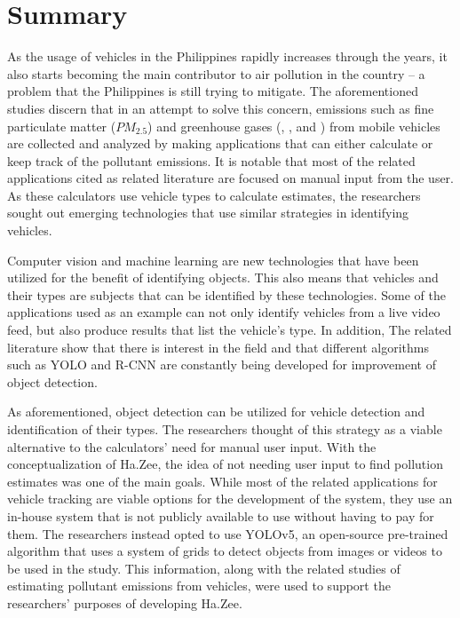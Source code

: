 \section{Summary}
 As the usage of vehicles in the Philippines rapidly increases through the years, it also starts becoming the main contributor to air pollution in the country – a problem that the Philippines is still trying to mitigate. The aforementioned studies discern that in an attempt to solve this concern, emissions such as fine particulate matter ($PM_{2.5}$) and greenhouse gases (, , and ) from mobile vehicles are collected and analyzed by making applications that can either calculate or keep track of the pollutant emissions. It is notable that most of the related applications cited as related literature are focused on manual input from the user. As these calculators use vehicle types to calculate estimates, the researchers sought out emerging technologies that use similar strategies in identifying vehicles.
 
	Computer vision and machine learning are new technologies that have been utilized for the benefit of identifying objects. This also means that vehicles and their types are subjects that can be identified by these technologies. Some of the applications used as an example can not only identify vehicles from a live video feed, but also produce results that list the vehicle's type. In addition, The related literature show that there is interest in the field and that different algorithms such as YOLO and R-CNN are constantly being developed for improvement of object detection.
	
	As aforementioned, object detection can be utilized for vehicle detection and identification of their types. The researchers thought of this strategy as a viable alternative to the calculators' need for manual user input. With the conceptualization of Ha.Zee, the idea of not needing user input to find pollution estimates was one of the main goals. While most of the related applications for vehicle tracking are viable options for the development of the system, they use an in-house system that is not publicly available to use without having to pay for them. The researchers instead opted to use YOLOv5, an open-source pre-trained algorithm that uses a system of grids to detect objects from images or videos to be used in the study. This information, along with the related studies of estimating pollutant emissions from vehicles, were used to support the researchers’ purposes of developing Ha.Zee.



